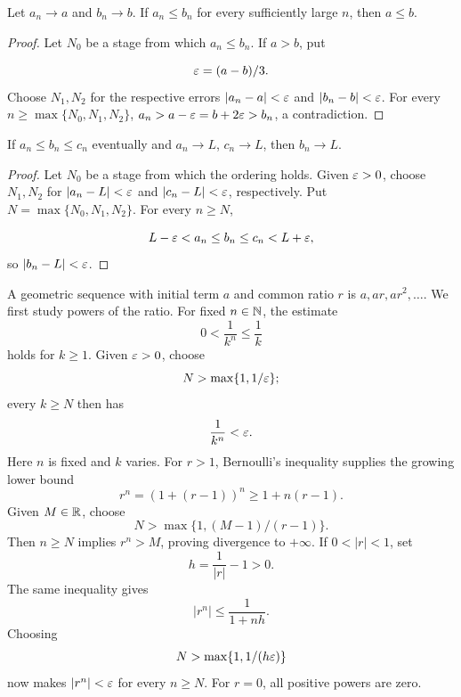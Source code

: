 \begin{theorem}
\label{thm:limit-order}
Let $a_n\to a$ and $b_n\to b$. If $a_n\leq b_n$ for every sufficiently large $n$, then $a\leq b$.
\end{theorem}
\begin{proof}
Let $N_0$ be a stage from which $a_n\leq b_n$. If $a>b$, put

\[
\varepsilon=(a-b)/3.
\]
 Choose $N_1,N_2$ for the respective errors
$|a_n-a|<\varepsilon$ and $|b_n-b|<\varepsilon$. For every
$n\geq\max\{N_0,N_1,N_2\}$,
$a_n>a-\varepsilon=b+2\varepsilon>b_n$, a contradiction.
\end{proof}

\begin{corollary}
\label{cor:squeeze}
If $a_n\leq b_n\leq c_n$ eventually and $a_n\to L$, $c_n\to L$, then $b_n\to L$.
\end{corollary}
\begin{proof}
Let $N_0$ be a stage from which the ordering holds. Given $\varepsilon>0$,
choose $N_1,N_2$ for $|a_n-L|<\varepsilon$ and $|c_n-L|<\varepsilon$,
respectively. Put $N=\max\{N_0,N_1,N_2\}$. For every $n\geq N$,

\[
L-\varepsilon<a_n\leq b_n\leq c_n<L+\varepsilon,
\]
 so $|b_n-L|<\varepsilon$.
\end{proof}


\begin{example}
A geometric sequence with initial term $a$ and common ratio $r$ is
$a,ar,ar^2,\ldots$. We first study powers of the ratio.
For fixed $n\in\mathbb{N}$, the estimate
\[
0<\frac1{k^n}\leq\frac1k
\]
 holds
for $k\geq1$. Given $\varepsilon>0$, choose
\[
N>\max\{1,1/\varepsilon\};
\]
 every
$k\geq N$ then has
\[
\frac1{k^n}<\varepsilon.
\]
 Here $n$ is fixed and $k$ varies.
For $r>1$, Bernoulli's inequality supplies the growing lower bound
\[
r^n=(1+(r-1))^n\geq1+n(r-1).
\]
Given $M\in\mathbb{R}$, choose
\[
N>\max\{1,(M-1)/(r-1)\}.
\]
 Then $n\geq N$
implies $r^n>M$, proving divergence to $+\infty$.
If $0<|r|<1$, set
\[
h=\frac1{|r|}-1>0.
\]
 The same inequality gives
\[
|r^n|\leq\frac1{1+nh}.
\]
Choosing
\[
N>\max\{1,1/(h\varepsilon)\}
\]
 now makes $|r^n|<\varepsilon$ for every
$n\geq N$. For $r=0$, all positive powers are zero.
\end{example}

